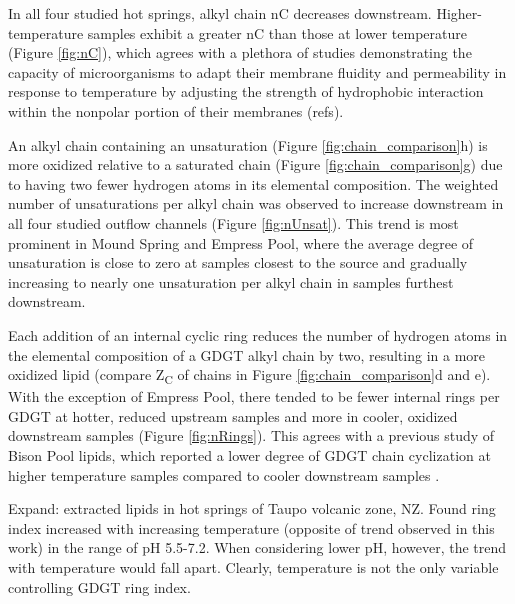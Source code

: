 In all four studied hot springs, alkyl chain nC decreases downstream. Higher-temperature samples exhibit a greater nC than those at lower temperature (Figure \ref{fig:nC}), which agrees with a plethora of studies demonstrating the capacity of microorganisms to adapt their membrane fluidity and permeability in response to temperature by adjusting the strength of hydrophobic interaction within the nonpolar portion of their membranes (refs).

An alkyl chain containing an unsaturation (Figure \ref{fig:chain_comparison}h) is more oxidized relative to a saturated chain (Figure \ref{fig:chain_comparison}g) due to having two fewer hydrogen atoms in its elemental composition. The weighted number of unsaturations per alkyl chain was observed to increase downstream in all four studied outflow channels (Figure \ref{fig:nUnsat}). This trend is most prominent in Mound Spring and Empress Pool, where the average degree of unsaturation is close to zero at samples closest to the source and gradually increasing to nearly one unsaturation per alkyl chain in samples furthest downstream.

Each addition of an internal cyclic ring reduces the number of hydrogen atoms in the elemental composition of a GDGT alkyl chain by two, resulting in a more oxidized lipid (compare Z\textsubscript{C} of chains in Figure \ref{fig:chain_comparison}d and e). With the exception of Empress Pool, there tended to be fewer internal rings per GDGT at hotter,  reduced upstream samples and more in cooler, oxidized downstream samples (Figure \ref{fig:nRings}). This agrees with a previous study of Bison Pool lipids, which reported a lower degree of GDGT chain cyclization at higher temperature samples compared to cooler downstream samples \citep{schubotz2013spatial}.

Expand:
\cite{kaur2015temperature} extracted lipids in hot springs of Taupo volcanic zone, NZ. Found ring index increased with increasing temperature (opposite of trend observed in this work) in the range of pH 5.5-7.2. When considering lower pH, however, the trend with temperature would fall apart. Clearly, temperature is not the only variable controlling GDGT ring index.


